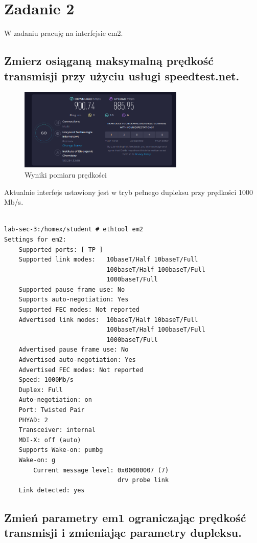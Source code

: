 \documentclass[polish, a4paper]{article}
\begin{document}
\section{Zadanie 2}

W zadaniu pracuję na interfejsie em2.

\subsection{Zmierz osiąganą maksymalną prędkość transmisji przy użyciu
usługi speedtest.net.}

\begin{figure}[H]
\centering
\includegraphics[width=0.7\textwidth]{speedtest1.png}
\caption{Wyniki pomiaru prędkości}
\end{figure}

Aktualnie interfejs ustawiony jest w tryb pełnego dupleksu przy prędkości 1000 Mb/s.

\begin{verbatim}

lab-sec-3:/homex/student # ethtool em2
Settings for em2:
	Supported ports: [ TP ]
	Supported link modes:   10baseT/Half 10baseT/Full
	                        100baseT/Half 100baseT/Full
	                        1000baseT/Full
	Supported pause frame use: No
	Supports auto-negotiation: Yes
	Supported FEC modes: Not reported
	Advertised link modes:  10baseT/Half 10baseT/Full
	                        100baseT/Half 100baseT/Full
	                        1000baseT/Full
	Advertised pause frame use: No
	Advertised auto-negotiation: Yes
	Advertised FEC modes: Not reported
	Speed: 1000Mb/s
	Duplex: Full
	Auto-negotiation: on
	Port: Twisted Pair
	PHYAD: 2
	Transceiver: internal
	MDI-X: off (auto)
	Supports Wake-on: pumbg
	Wake-on: g
        Current message level: 0x00000007 (7)
                               drv probe link
	Link detected: yes

\end{verbatim}


\subsection{Zmień parametry em1 ograniczając prędkość transmisji i
zmieniając parametry dupleksu.}
\end{document}
